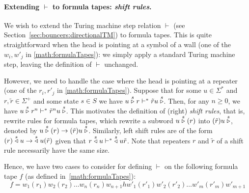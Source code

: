 



\paragraph*{Extending $\vdash$ to formula tapes: \textit{shift rules}.} We wish to extend the Turing machine step relation $\vdash$ (see Section~\ref{sec:bouncers:directionalTM}) to formula tapes. This is quite straightforward when the head is pointing at a symbol of a wall (one of the $w_i, w'_j$ in \eqref{math:formulaTapes}): we simply apply a standard Turing machine step, leaving the definition of $\vdash$ unchanged.

However, we need to handle the case where the head is pointing at a repeater (one of the $r_i, r'_j$ in \eqref{math:formulaTapes}). Suppose that for some $u\in\Sigma^*$ and $r,\tilde{r}\in\Sigma^+$ and some state $s\in S$ we have $u \stackrel{s}\triangleright r \vdash^* \tilde{r} u \stackrel{s}\triangleright$. Then, for any $n\geq 0$, we have $u \stackrel{s}\triangleright r^n \vdash^* \tilde{r}^n u \stackrel{s}\triangleright$. This motivates the definition of
(right) \textit{shift rules}, that is, rewrite rules for formula tapes, which rewrite a subword $u \stackrel{s}\triangleright(r)$ into $(\tilde{r})u\stackrel{s}\triangleright$, denoted by $u \stackrel{s}\triangleright(r) \to (\tilde{r})u\stackrel{s}\triangleright$. Similarly, left shift rules are of the form $(r)\stackrel{s}\triangleleft u \to \;\stackrel{s}\triangleleft u(\tilde{r})$ given that $r\stackrel{s}\triangleleft u \vdash^* \;\stackrel{s}\triangleleft u\tilde{r}$. Note that repeaters $r$ and $\tilde{r}$ of a shift rule necessarily have the same size.

Hence, we have two cases to consider for defining $\vdash$ on the following formula tape $f$ (as defined in~\eqref{math:formulaTapes}):
$$f = w_1(r_1)w_2(r_2)\dots w_n(r_n) w_{n+1} h w'_1(r'_1)w'_2(r'_2)\dots w'_m(r'_m) w'_{m+1}$$

